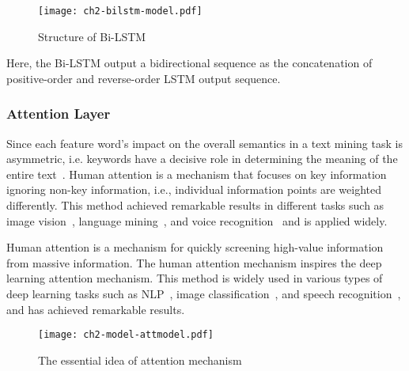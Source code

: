 \begin{figure}[htb]
    \centering
    \texttt{[image: ch2-bilstm-model.pdf]}
    \caption{Structure of Bi-LSTM}\label{fig:ch2-model-bilstm}
\end{figure}

Here, the Bi-LSTM output a bidirectional sequence as the concatenation of positive-order and reverse-order LSTM output sequence.



\subsubsection{Attention Layer}




Since each feature word's impact on the overall semantics in a text mining task is asymmetric, i.e. keywords have a decisive role in determining the meaning of the entire text~\cite{chaudhari2020attentive}. Human attention is a mechanism that focuses on key information ignoring non-key information, i.e., individual information points are weighted differently. This method achieved remarkable results in different tasks such as image vision~\cite{fu2017look,sun2018multi}, language mining~\cite{hu2019introductory}, and voice recognition~\cite{chorowski2015attention} and is applied widely.


Human attention is a mechanism for quickly screening high-value information from massive information. The human attention mechanism inspires the deep learning attention mechanism. This method is widely used in various types of deep learning tasks such as NLP~\cite{hu2019introductory}, image classification~\cite{fu2017look,sun2018multi}, and speech recognition~\cite{chorowski2015attention}, and has achieved remarkable results.

\begin{figure}[htb]
    \centering
    \texttt{[image: ch2-model-attmodel.pdf]}
    \caption{The essential idea of attention mechanism}\label{fig:ch2-model-attmodel}
\end{figure}


